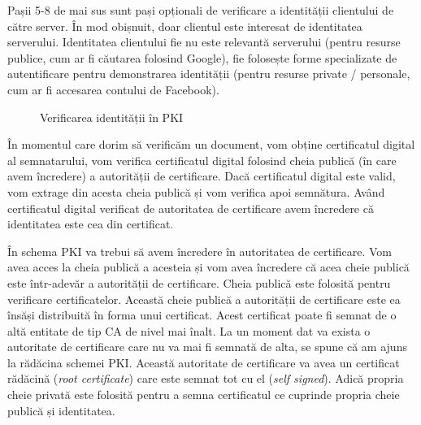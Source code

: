 Pașii 5-8 de mai sus sunt pași opționali de verificare a identității clientului de către server.
În mod obișnuit, doar clientul este interesat de identitatea serverului.
Identitatea clientului fie nu este relevantă serverului (pentru resurse publice, cum ar fi căutarea folosind Google), fie folosește forme specializate de autentificare pentru demonstrarea identității (pentru resurse private / personale, cum ar fi accesarea contului de Facebook).

\begin{figure}[htbp]
  \centering
  \begin{subfigure}[b]{0.48\textwidth}
    \centering
    \def\svgwidth{\columnwidth}
    
  \end{subfigure}
  \begin{subfigure}[b]{0.48\textwidth}
    \centering
    \def\svgwidth{\columnwidth}
    
  \end{subfigure}
  \begin{subfigure}[b]{0.48\textwidth}
    \centering
    \def\svgwidth{\columnwidth}
    
  \end{subfigure}
  \begin{subfigure}[b]{0.48\textwidth}
    \centering
    \def\svgwidth{\columnwidth}
    
  \end{subfigure}
  \begin{subfigure}[b]{0.48\textwidth}
    \centering
    \def\svgwidth{\columnwidth}
    
  \end{subfigure}
  \caption{Verificarea identității în PKI}
  \label{fig:sec:pki}
\end{figure}

În momentul care dorim să verificăm un document, vom obține certificatul digital al semnatarului, vom verifica certificatul digital folosind cheia publică (în care avem încredere) a autorității de certificare. Dacă certificatul digital este valid, vom extrage din acesta cheia publică și vom verifica apoi semnătura. Având certificatul digital verificat de autoritatea de certificare avem încredere că identitatea este cea din certificat.

În schema PKI va trebui să avem încredere în autoritatea de certificare. Vom avea acces la cheia publică a acesteia și vom avea încredere că acea cheie publică este într-adevăr a autorității de certificare. Cheia publică este folosită pentru verificare certificatelor. Această cheie publică a autorității de certificare este ea însăși distribuită în forma unui certificat. Acest certificat poate fi semnat de o altă entitate de tip CA de nivel mai înalt. La un moment dat va exista o autoritate de certificare care nu va mai fi semnată de alta, se spune că am ajuns la rădăcina schemei PKI. Această autoritate de certificare va avea un certificat rădăcină (\textit{root certificate}) care este semnat tot cu el (\textit{self signed}). Adică propria cheie privată este folosită pentru a semna certificatul ce cuprinde propria cheie publică și identitatea.

